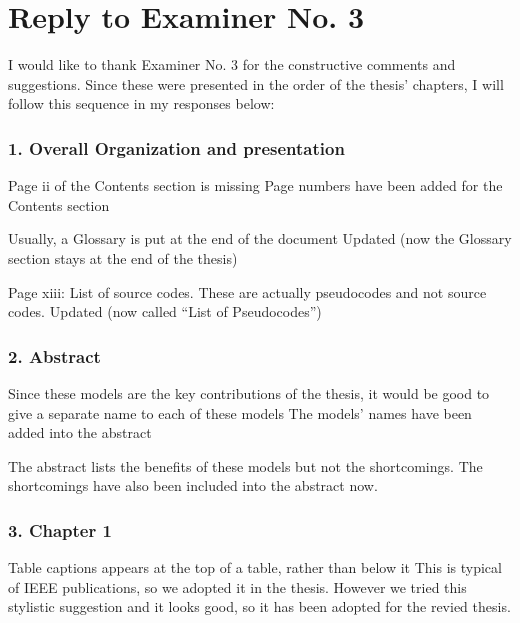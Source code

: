 \section*{Reply to Examiner No. 3}

\begin{replyheader}
\end{replyheader}  

I would like to thank Examiner No. 3 for the constructive comments and suggestions. Since these were presented in the order of the thesis' chapters, I will follow this sequence in my responses below:

\subsubsection*{1. Overall Organization and presentation}

\replyToComment
    {Page ii of the Contents section is missing}
    {Page numbers have been added for the Contents section}

\replyToComment
    {Usually, a Glossary is put at the end of the document}
    {Updated (now the Glossary section stays at the end of the thesis)}

\replyToComment
    {Page xiii: List of source codes. These are actually pseudocodes and not source codes.}
    {Updated (now called ``List of Pseudocodes'')}

\subsubsection*{2. Abstract}

\replyToComment
    {Since these models are the key contributions of the thesis, it would be good to give a separate name to each of these models}
    {The models' names have been added into the abstract}

\replyToComment
    {The abstract lists the benefits of these models but not the shortcomings.}
    {The shortcomings have also been included into the abstract now.}

\subsubsection*{3. Chapter 1}

\replyToComment
    {Table captions appears at the top of a table, rather than below it}
    {This is typical of IEEE publications, so we adopted it in the thesis. However we tried this stylistic suggestion and it looks good, so it has been adopted for the revied thesis.}

